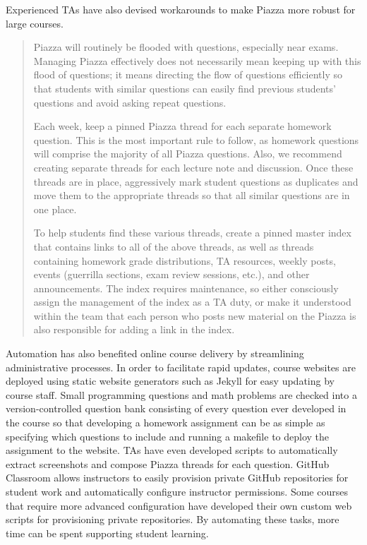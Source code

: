 Experienced TAs have also devised workarounds to make Piazza more robust for large courses.
\begin{quotation}
    Piazza will routinely be flooded with questions, especially near exams. Managing Piazza effectively does not necessarily mean keeping up with this flood of questions; it means directing the flow of questions efficiently so that students with similar questions can easily find previous students' questions and avoid asking repeat questions.

    Each week, keep a pinned Piazza thread for each separate homework question. This is the most important rule to follow, as homework questions will comprise the majority of all Piazza questions. Also, we recommend creating separate threads for each lecture note and discussion. Once these threads are in place, aggressively mark student questions as duplicates and move them to the appropriate threads so that all similar questions are in one place.

    To help students find these various threads, create a pinned master index that contains links to all of the above threads, as well as threads containing homework grade distributions, TA resources, weekly posts, events (guerrilla sections, exam review sessions, etc.), and other announcements. The index requires maintenance, so either consciously assign the management of the index as a TA duty, or make it understood within the team that each person who posts new material on the Piazza is also responsible for adding a link in the index.
\end{quotation}

Automation has also benefited online course delivery by streamlining administrative processes. In order to facilitate rapid updates, course websites are deployed using static website generators such as Jekyll for easy updating by course staff. Small programming questions and math problems are checked into a version-controlled question bank consisting of every question ever developed in the course so that developing a homework assignment can be as simple as specifying which questions to include and running a makefile to deploy the assignment to the website. TAs have even developed scripts to automatically extract screenshots and compose Piazza threads for each question. GitHub Classroom allows instructors to easily provision private GitHub repositories for student work and automatically configure instructor permissions. Some courses that require more advanced configuration have developed their own custom web scripts for provisioning private repositories. By automating these tasks, more time can be spent supporting student learning.

